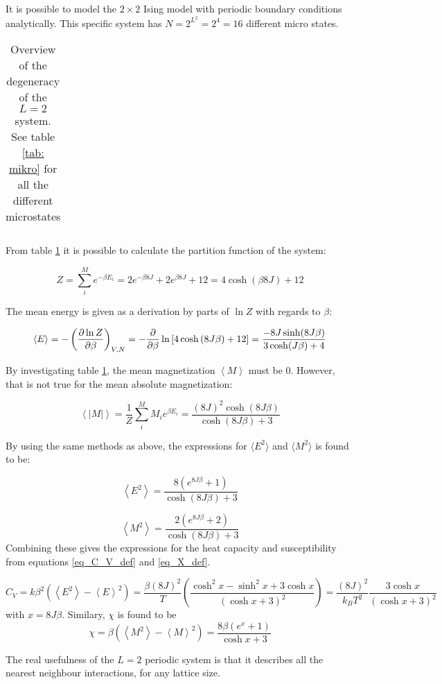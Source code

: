 It is possible to model the $ 2\times 2 $ Ising model with periodic boundary conditions analytically. This specific system has $ N = 2^{L^2} = 2^4=16 $ different micro states. 


\begin{table}[H]
	\caption{Overview  of the degeneracy of the $ L=2 $ system. See table \ref{tab: mikro} for all the different microstates}
	\label{tab: makro}
	\begin{tabular}{cccccc}
		
	\end{tabular}
\end{table}

From table \ref{tab: makro} it is possible to calculate the partition function of the system: 

\[
Z = \sum_i^M e^{-\beta E_i} = 2e^{-\beta 8 J}  + 2e^{\beta 8 J} + 12 = 4 \cosh\left( \beta 8 J \right) + 12
\]

The mean energy is given as a derivation by parts of $ \ln Z $ with regards to $ \beta $:

\[ 	\langle E \rangle = - \left(\pdv{\ln Z}{\beta}\right)_{V,N} = 	 - \frac{\partial}{\partial \beta} \ln \left[ 4 \cosh \left( 8J\beta\right)+12\right] =\frac{-8J \sinh(8J\beta)}{3\cosh(J\beta)+ 4} \]  

By investigating table \ref{tab: makro}, the mean magnetization 
$
\left< M \right> $ must be $0$. However, that is not true for the mean absolute magnetization:

\[
\left< |M| \right> = \frac{1}{Z} \sum_i^M M_i e^{\beta E_i}  = \frac{(8J)^2 \cosh(8J\beta )}{\cosh (8J\beta ) + 3}
\]

By using the same methods as above, the expressions for $ \langle E^2 \rangle  $ and  $ \langle M^2 \rangle  $ is found to be:

\[
\left< E^2 \right> = \frac{8 \left( e^{8J\beta } + 1\right) }{\cosh (8J\beta ) + 3}
\]


\[
\left< M^2 \right>  = \frac{2 \left( e^{8J\beta } + 2\right) }{\cosh (8J\beta ) + 3}
\]
Combining these gives the expressions for the heat capacity and susceptibility from equations \ref{eq_C_V_def} and \ref{eq_X_def}.

\[
C_V = k \beta^2\left( \left< E^2\right> - \left< E\right>^2 \right) = \frac{\beta (8J)^2}{T} \left( \frac{\cosh^2x -\sinh^2 x + 3 \cosh x}{(\cosh x + 3)^2}\right) = \frac{ (8J)^2}{k_BT^2}  \frac{ 3 \cosh x}{(\cosh x + 3)^2}
\]
with $ x = 8J\beta $. Similary, $ \chi $ is found to be
\[
\chi = \beta \left( \left< M^2\right> - \left< M\right>^2\right) = \frac{8\beta \left( e^{x} +1\right)}{\cosh x +3}
\]

The real usefulness of the $ L=2 $ periodic system is that it describes all the nearest neighbour interactions, for any lattice size. 

